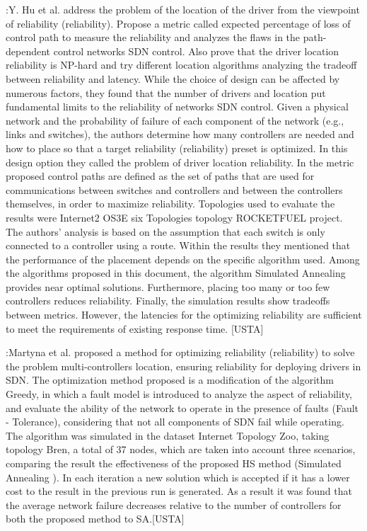 \documentclass[a4paper,10pt]{article}
\begin{document}
\cite{HuWa14}:Y. Hu et al. address the problem of the location of the driver from the viewpoint of reliability (reliability). Propose a metric called expected percentage of loss of control path to measure the reliability and analyzes the flaws in the path-dependent control networks SDN control. Also prove that the driver location reliability is NP-hard and try different location algorithms analyzing the tradeoff between reliability and latency. While the choice of design can be affected by numerous factors, they found that the number of drivers and location put fundamental limits to the reliability of networks SDN control. Given a physical network and the probability of failure of each component of the network (e.g., links and switches), the authors determine how many controllers are needed and how to place so that a target reliability (reliability) preset is optimized. In this design option they called the problem of driver location reliability. In the metric proposed control paths are defined as the set of paths that are used for communications between switches and controllers and between the controllers themselves, in order to maximize reliability.
Topologies used to evaluate the results were Internet2 OS3E six Topologies topology ROCKETFUEL project. The authors' analysis is based on the assumption that each switch is only connected to a controller using a route. Within the results they mentioned that the performance of the placement depends on the specific algorithm used. Among the algorithms proposed in this document, the algorithm Simulated Annealing provides near optimal solutions. Furthermore, placing too many or too few controllers reduces reliability. Finally, the simulation results show tradeoffs between metrics. However, the latencies for the optimizing reliability are sufficient to meet the requirements of existing response time. [USTA]





\cite{MaJe18}:Martyna et al. proposed a method for optimizing reliability (reliability) to solve the problem multi-controllers location, ensuring reliability for deploying drivers in SDN. The optimization method proposed is a modification of the algorithm Greedy, in which a fault model is introduced to analyze the aspect of reliability, and evaluate the ability of the network to operate in the presence of faults (Fault - Tolerance), considering that not all components of SDN fail while operating. The algorithm was simulated in the dataset Internet Topology Zoo, taking topology Bren, a total of 37 nodes, which are taken into account three scenarios, comparing the result the effectiveness of the proposed HS method (Simulated Annealing ). In each iteration a new solution which is accepted if it has a lower cost to the result in the previous run is generated. As a result it was found that the average network failure decreases relative to the number of controllers for both the proposed method to SA.[USTA]
\end{document}
